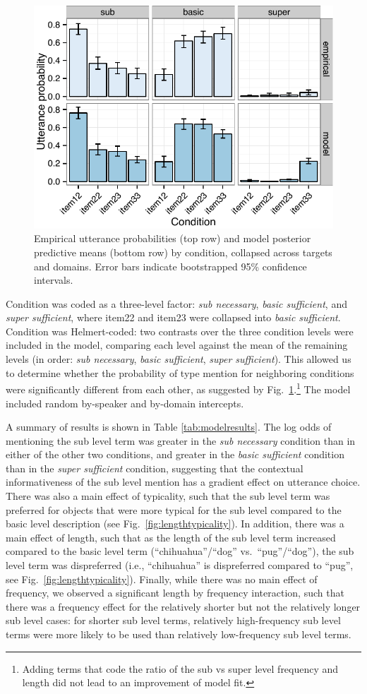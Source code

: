 \documentclass[10pt,letterpaper]{article}
\newcommand{\tableref}[1]{Table \ref{#1}}
\newcommand{\figref}[1]{Fig.~\ref{#1}}
\begin{document}
\begin{figure}[bt]
\centering
\includegraphics[width=.5\textwidth]{graphs/qualitativepattern}
\caption{Empirical utterance probabilities (top row) and model posterior predictive means (bottom row) by condition, collapsed across targets and domains. Error bars indicate bootstrapped 95\% confidence intervals.}
\label{fig:qualitativemodel}
\end{figure}

Condition was coded as a three-level factor: \emph{sub necessary}, \emph{basic sufficient}, and \emph{super sufficient}, where item22 and item23 were collapsed into \emph{basic sufficient}. Condition was Helmert-coded: two contrasts over the three condition levels were included in the model, comparing each level against the mean of the remaining levels (in order: \emph{sub necessary}, \emph{basic sufficient}, \emph{super sufficient}). This allowed us to determine whether the probability of type mention  for neighboring conditions were significantly different from each other, as suggested by \figref{fig:qualitativemodel}.\footnote{Adding terms that code the ratio of the sub vs super level frequency and length did not lead to an improvement of model fit.} The model included random by-speaker and by-domain intercepts. 

A summary of results is shown in \tableref{tab:modelresults}. The log odds of mentioning the sub level term was greater in the \emph{sub necessary} condition than in either of the other two conditions, and greater in the \emph{basic sufficient} condition than in the \emph{super sufficient} condition, suggesting that the contextual informativeness of the sub level mention has a gradient effect on utterance choice. There was also a main effect of typicality, such that the sub level term was preferred for objects that were more typical for the sub level compared to the basic level  description (see \figref{fig:lengthtypicality}). In addition, there was a main effect of length, such that as the length of the sub level term increased compared to the basic level term (``chihuahua''/``dog'' vs.~``pug''/``dog''), the sub level term was dispreferred (i.e., ``chihuahua'' is dispreferred compared to ``pug'', see \figref{fig:lengthtypicality}). Finally, while there was no main effect of frequency, we observed a significant length by frequency interaction, such that there was a frequency effect for the relatively shorter but not the relatively longer sub level cases: for shorter sub level terms, relatively high-frequency sub level terms were more likely to be used than relatively low-frequency sub level terms. 
\end{document}
